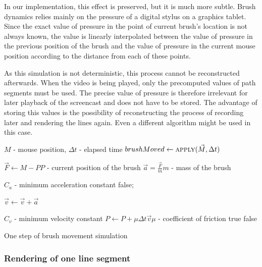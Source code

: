 In our implementation, this effect is preserved, but it is much more subtle. Brush dynamics relies mainly on the pressure of a digital stylus on a graphics tablet. Since the exact value of pressure in the point of current brush's location is not always known, the value is linearly interpolated between the value of pressure in the previous position of the brush and the value of pressure in the current mouse position according to the distance from each of these points.

As this simulation is not deterministic, this process cannot be reconstructed afterwards. When the video is being played, only the precomputed values of path segments must be used. The precise value of pressure is therefore irrelevant for later playback of the screencast and does not have to be stored. The advantage of storing this values is the possibility of reconstructing the process of recording later and rendering the lines again. Even a different algorithm might be used in this case.

\begin{pseudocode}
  \begin{algorithmic}

  	 \Comment $M$ - mouse position, $\Delta t$ - elapsed time
	      \State $brushMoved \gets \Call{apply}{\vec{M}, \Delta t} $
              \State {}
          \EndIf
      \EndIf
 	\EndFunction

      \State $ \vec{F} \gets M - P $\Comment $P$ - current position of the brush
      \State $ \vec{a} = \frac{\vec{F}}{m} $\Comment $m$ - mass of the brush

       \Comment $C_a$ - minimum acceleration constant
	      \State \Return false;    
       \EndIf
      
      \State $\vec{v} \gets \vec{v} + \vec{a}$

       \Comment $C_v$ - minimum velocity constant
          \State $ P \gets P + \mu\Delta t\vec{v} $\Comment $\mu$ - coefficient of friction
		  \State \Return true
      \EndIf
      \State \Return false
  	\EndFunction
  \end{algorithmic}
\caption{One step of brush movement simulation}
\label{alg:one-step}
\end{pseudocode}

\subsubsection*{Rendering of one line segment}

